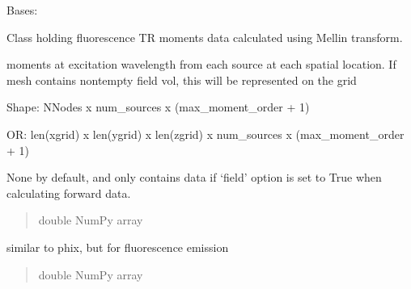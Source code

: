 \documentclass[letterpaper,10pt,english]{sphinxmanual}
\begin{document}
\begin{fulllineitems}
\label{\detokenize{_autosummary/nirfasterff.base.data.flTRMomentsdata:nirfasterff.base.data.flTRMomentsdata}}
\pysigstartsignatures
\pysigline
{}
\pysigstopsignatures
\sphinxAtStartPar
Bases: 

\sphinxAtStartPar
Class holding fluorescence TR moments data calculated using Mellin transform.

\begin{fulllineitems}
\label{\detokenize{_autosummary/nirfasterff.base.data.flTRMomentsdata:nirfasterff.base.data.flTRMomentsdata.phix}}
\pysigstartsignatures
\pysigline
{}
\pysigstopsignatures
\sphinxAtStartPar
moments at excitation wavelength from each source at each spatial location. If mesh contains non\sphinxhyphen{}tempty field vol, this will be represented on the grid

\sphinxAtStartPar
Shape: NNodes x num\_sources x (max\_moment\_order + 1)

\sphinxAtStartPar
OR: len(xgrid) x len(ygrid) x len(zgrid) x num\_sources x (max\_moment\_order + 1)

\sphinxAtStartPar
None by default, and only contains data if ‘field’ option is set to True when calculating forward data.
\begin{quote}\begin{description}
\sphinxAtStartPar
double NumPy array

\end{description}\end{quote}

\end{fulllineitems}


\begin{fulllineitems}
\label{\detokenize{_autosummary/nirfasterff.base.data.flTRMomentsdata:nirfasterff.base.data.flTRMomentsdata.phifl}}
\pysigstartsignatures
\pysigline
{}
\pysigstopsignatures
\sphinxAtStartPar
similar to phix, but for fluorescence emission
\begin{quote}\begin{description}
\sphinxAtStartPar
double NumPy array


\end{description}
\end{quote}
\end{fulllineitems}
\end{fulllineitems}
\end{document}
